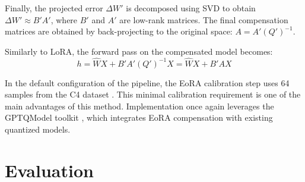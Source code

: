 Finally, the projected error $\Delta W'$ is decomposed using SVD to obtain $\Delta W' \approx B'A'$, where $B'$ and $A'$ are low-rank matrices. The final compensation matrices are obtained by back-projecting to the original space: $A = A'(Q')^{-1}$.

Similarly to LoRA, the forward pass on the compensated model becomes:
\begin{equation}
h = \hat{W}X + B'A'(Q')^{-1}X = \hat{W}X + B'AX
\end{equation}

In the default configuration of the pipeline, the EoRA calibration step uses 64 samples from the C4 dataset \cite{c4}. This minimal calibration requirement is one of the main advantages of this method. Implementation once again leverages the GPTQModel toolkit \cite{gptqmodel}, which integrates EoRA compensation with existing quantized models.


\section{Evaluation} \label{evaluation}
